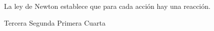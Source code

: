 
\question La \fillin \enspace ley de Newton establece que para cada acción
          hay una reacción.

  \begin{oneparchoices}
    \CorrectChoice Tercera
    \choice Segunda
    \choice Primera
    \choice Cuarta
  \end{oneparchoices}
  \answerline[A]
